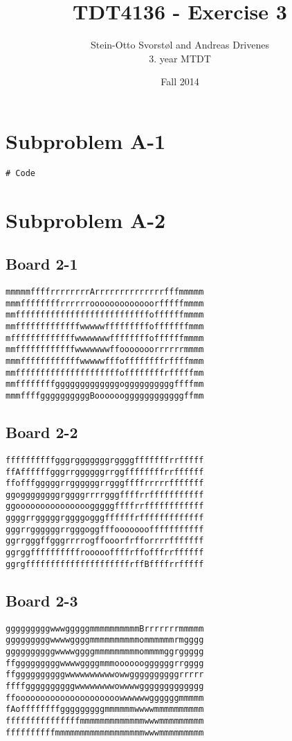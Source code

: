 \documentclass[11pt,a4paper]{article}
\author{Stein-Otto Svorstøl and Andreas Drivenes
\\3. year MTDT}
\title{TDT4136 - Exercise 3}
\date{Fall 2014}
\begin{document}
\maketitle

\section*{Subproblem A-1}
\begin{lstlisting}
# Code
\end{lstlisting}

\section*{Subproblem A-2}
\subsection*{Board 2-1}
\begin{lstlisting}
mmmmmffffrrrrrrrrArrrrrrrrrrrrrrfffmmmmm
mmmffffffffrrrrrrooooooooooooorfffffmmmm
mmfffffffffffffffffffffffffffoffffffmmmm
mmfffffffffffffwwwwwfffffffffofffffffmmm
mfffffffffffffwwwwwwwffffffffoffffffmmmm
mmffffffffffffwwwwwwwffooooooorrrrrrmmmm
mmmffffffffffffwwwwwfffoffffffffrffffmmm
mmfffffffffffffffffffffoffffffffrfffffmm
mmffffffffgggggggggggggoggggggggggffffmm
mmmffffggggggggggBooooooggggggggggggffmm
\end{lstlisting}

\subsection*{Board 2-2}
\begin{lstlisting}
ffffffffffgggrgggggggrggggfffffffrrfffff
ffAffffffgggrrggggggrrggffffffffrrffffff
ffofffgggggrrggggggrrgggffffrrrrrfffffff
ggoggggggggrggggrrrrgggffffrrfffffffffff
ggooooooooooooooogggggffffrrffffffffffff
ggggrrgggggrggggogggffffffrfffffffffffff
gggrrggggggrrgggoggfffooooooofffffffffff
ggrrgggffgggrrrrogffooorfrfforrrrfffffff
ggrggffffffffffroooooffffrffofffrrffffff
ggrgfffffffffffffffffffffrffBffffrrfffff
\end{lstlisting}

\subsection*{Board 2-3}
\begin{lstlisting}
gggggggggwwwgggggmmmmmmmmmmBrrrrrrrmmmmm
gggggggggwwwwggggmmmmmmmmmmommmmmmrmgggg
ggggggggggwwwwggggmmmmmmmmmommmmggrggggg
ffgggggggggwwwwggggmmmooooooggggggrrgggg
ffggggggggggwwwwwwwwwwowwggggggggggrrrrr
ffffggggggggggwwwwwwwwowwwwggggggggggggg
ffooooooooooooooooooooowwwwwwggggggmmmmm
fAoffffffffgggggggggmmmmmmwwwwmmmmmmmmmm
fffffffffffffffmmmmmmmmmmmmmwwwmmmmmmmmm
ffffffffffmmmmmmmmmmmmmmmmmmwwwmmmmmmmmm
\end{lstlisting}
\end{document}
